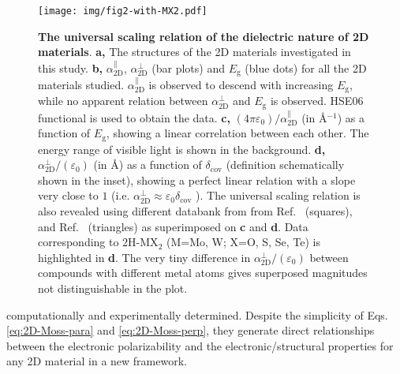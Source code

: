 \documentclass[journal=ancac3,manuscript=article,email=true,hyperref=true,keywords=false]{achemso}
\begin{document}
\begin{figure}[H]
\centering
\texttt{[image: img/fig2-with-MX2.pdf]}
\caption{\label{fig-3} \textbf{The universal scaling relation of the
    dielectric nature of 2D materials}. 
    \textbf{a,} The structures of
  the 2D materials investigated in this 
  study. 
  \textbf{b,} $\alpha_{\mathrm{2D}}^{\parallel}$,
  $\alpha_{\mathrm{2D}}^{\perp}$ (bar plots) and $E_{\mathrm{g}}$
  (blue dots) for all the 2D materials studied.
  $\alpha_{\mathrm{2D}}^{\parallel}$ is observed to descend with
  increasing $E_{\mathrm{g}}$, while no apparent relation between
  $\alpha_{\mathrm{2D}}^{\perp}$ and $E_{\mathrm{g}}$ is
  observed. HSE06 functional is used to obtain the data. 
  \textbf{c,} $(4\pi \varepsilon_{0})/\alpha_{\mathrm{2D}}^{\parallel}$ (in
  \AA{}$^{-1}$) as a function of $E_{\mathrm{g}}$, showing a linear
  correlation between each other. The energy range of visible light is
  shown in the background. 
  \textbf{d,} $\alpha_{\mathrm{2D}}^{\perp}/(\varepsilon_{0})$ (in \AA{}) as a
  function of $\delta_{\mathrm{cov}}$ (definition schematically shown
  in the inset), showing a perfect linear relation with a slope very
  close to $1$ (i.e.
  $\alpha_{\mathrm{2D}}^{\perp} \approx \varepsilon_{0}
  \delta_{\mathrm{cov}}$ ). The universal scaling relation is also
  revealed using different databank from 
  from Ref.~ (squares),
  and Ref.~ (triangles) as superimposed on
  \textbf{c} and \textbf{d}. Data corresponding to 2H-MX$_2$ 
  (M=Mo, W; X=O, S, Se, Te) is highlighted in {\bf d}. The very tiny 
  difference in $\alpha_{\mathrm{2D}}^{\perp}/(\varepsilon_{0})$
  between compounds with different metal atoms 
  gives superposed magnitudes not distinguishable in the plot. 
  }
\end{figure}
%
%
computationally and experimentally determined. Despite the
simplicity of Eqs. \ref{eq:2D-Moss-para} and \ref{eq:2D-Moss-perp},
they generate direct relationships between the electronic polarizability and
the electronic/structural properties for any 2D material in a new
framework.
\end{document}
